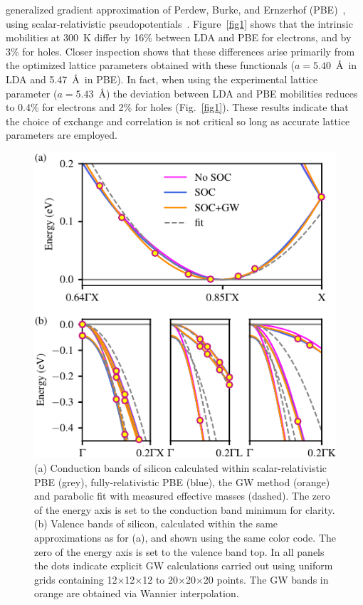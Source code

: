 \documentclass[aps,prl,twocolumn,superscriptaddress]{revtex4-1}
\begin{document}
generalized gradient approximation of Perdew, Burke, and Ernzerhof (PBE)~\cite{Perdew1996}, using scalar-relativistic pseudopotentials~\cite{Hamann2013}. Figure~\ref{fig1} shows that the intrinsic mobilities
at 300~K differ by 16\% between LDA and PBE for electrons, and by 3\% for holes. Closer inspection
shows that these differences arise primarily from the optimized lattice parameters obtained with
these functionals ($a=5.40$~\AA\ in LDA and 5.47~\AA\ in PBE). In fact, when using the experimental 
lattice parameter ($a=5.43$~\AA) the deviation between LDA and PBE mobilities reduces to 0.4\% for 
electrons and 2\% for holes (Fig.~\ref{fig1}). These results indicate that the choice of exchange and correlation
is not critical so long as accurate lattice parameters are employed.

\begin{figure}
  \centering
  \includegraphics[width=\columnwidth]{fig2.pdf}
  \caption{\label{fig2}
  (a) Conduction bands of silicon calculated within scalar-relativistic PBE (grey), fully-relativistic PBE
  (blue), the GW method (orange) and parabolic fit with measured effective masses (dashed).
  The zero of the energy axis is set to the conduction band minimum
  for clarity. (b) Valence bands of silicon, calculated within the same approximations as for (a), and
  shown using the same color code. The zero of the energy axis is set to the valence band top.
  In all panels the dots indicate explicit GW calculations carried out using uniform grids containing
  12$\times$12$\times$12 to 20$\times$20$\times$20 points. The GW bands in orange are obtained via
  Wannier interpolation. 
  }
\end{figure}
\end{document}
